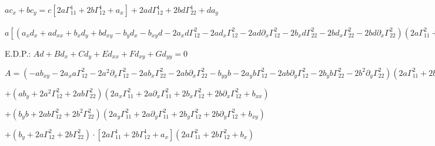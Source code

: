 \documentclass[10pt,a4paper]{article}
\begin{document}
		$a c_x + b c_y = c[2a\Gamma_{11}^1 + 2b\Gamma_{12}^1 + a_x]  + 2ad\Gamma_{12}^1 + 2bd\Gamma_{22}^1 + d a_y$

		\vspace{3mm}

		$a [(a_x d_x + a d_{xx} + b_x d_y + b d_{xy} - b_y d_x - b_{xy}d  - 2 a_x d\Gamma_{12}^2 - 2 a d_x \Gamma_{12}^2 - 2 a d \partial_x \Gamma_{12}^2 - 2b_x d\Gamma_{22}^2 - 2 b d_x \Gamma_{22}^2 - 2bd \partial_x \Gamma_{22}^2) (2a\Gamma_{11}^2 + 2b\Gamma_{12}^2 + b_x) - (a d_x   + b d_y - b_y d -  2ad\Gamma_{12}^2 - 2bd\Gamma_{22}^2) (2a_x \Gamma_{11}^2 + 2a \partial_x \Gamma_{11}^2 + 2b_x\Gamma_{12}^2 + 2b\partial_x \Gamma_{12}^2 + b_{xx})] + b [(a_y d_x + a d_{xy} + b d_{yy} - b_{yy} d - 2 a_y d\Gamma_{12}^2 - 2 a d_y \Gamma_{12}^2 - 2 a d \partial_y \Gamma_{12}^2 - 2b_y d\Gamma_{22}^2 - 2 b d_y \Gamma_{22}^2 - 2bd \partial_y \Gamma_{22}^2)(2a\Gamma_{11}^2 + 2b\Gamma_{12}^2 + b_x) - (a d_x   + b d_y - b_y d -  2ad\Gamma_{12}^2 - 2bd\Gamma_{22}^2) (2a_y \Gamma_{11}^2 + 2a \partial_y \Gamma_{11}^2 + 2b_y\Gamma_{12}^2 + 2b\partial_y \Gamma_{12}^2 + b_{xy})] = (2a\Gamma_{11}^2 + 2b\Gamma_{12}^2 + b_x) (a d_x   + b d_y - b_y d -  2ad\Gamma_{12}^2 - 2bd\Gamma_{22}^2) \cdot [2a\Gamma_{11}^1 + 2b\Gamma_{12}^1 + a_x]  + (2a\Gamma_{11}^2 + 2b\Gamma_{12}^2 + b_x)^2 [2ad\Gamma_{12}^1 + 2bd\Gamma_{22}^1 + a_y d]$

		\vspace{3mm}

		E.D.P.: $Ad + B d_x + C d_y + E d_{xx} + F d_{xy} + G d_{yy} = 0$

		\vspace{3mm}

		$A = (-ab_{xy} - 2 a_x a \Gamma_{12}^2 - 2 a^2 \partial_x \Gamma_{12}^2- 2ab_x \Gamma_{22}^2- 2ab \partial_x \Gamma_{22}^2 - b_{yy} b - 2a_y b \Gamma_{12}^2 - 2ab\partial_y \Gamma_{12}^2 - 2b_yb\Gamma_{22}^2 - 2 b^2\partial_y \Gamma_{22}^2)(2a\Gamma_{11}^2 + 2b\Gamma_{12}^2 + b_x)$

		$+ (ab_y + 2a^2\Gamma_{12}^2 + 2ab\Gamma_{22}^2)(2a_x \Gamma_{11}^2 + 2a \partial_x \Gamma_{11}^2 + 2b_x\Gamma_{12}^2 + 2b\partial_x \Gamma_{12}^2 + b_{xx})$

		$+ (b_y b + 2ab\Gamma_{12}^2 + 2b^2\Gamma_{22}^2)(2a_y \Gamma_{11}^2 + 2a \partial_y \Gamma_{11}^2 + 2b_y\Gamma_{12}^2 + 2b\partial_y \Gamma_{12}^2 + b_{xy})$

		$+ (b_y + 2a\Gamma_{12}^2 + 2b\Gamma_{22}^2)\cdot [2a\Gamma_{11}^1 + 2b\Gamma_{12}^1 + a_x](2a\Gamma_{11}^2 + 2b\Gamma_{12}^2 + b_x)$
\end{document}
